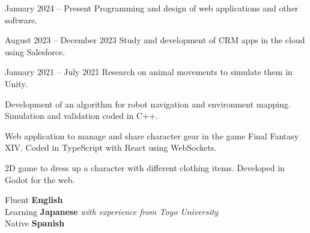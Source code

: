 \documentclass[a4paper,11pt]{memoir} %
\begin{document}
\userinformation %

\framebreak %


\heading{\fullname} %



\Sep


{January 2024 -- Present}
{Programming and design of web applications and other software.}

{August 2023 -- December 2023}
{Study and development of CRM apps in the cloud using Salesforce.}

{January 2021 -- July 2021}
{Research on animal movements to simulate them in Unity.}

\Sep


{}
{Development of an algorithm for robot navigation and environment mapping. Simulation and validation coded in C++.}

{}
{Web application to manage and share character gear in the game Final Fantasy XIV. Coded in TypeScript with React using WebSockets.}

{}
{2D game to dress up a character with different clothing items. Developed in Godot for the web.}

\Sep


\techtable

\Sep


\bluebullet Fluent \textbf{English} \\
\bluebullet Learning \textbf{Japanese} \textit{with experience from Toyo University} \\
\bluebullet Native \textbf{Spanish} \\
\end{document}
